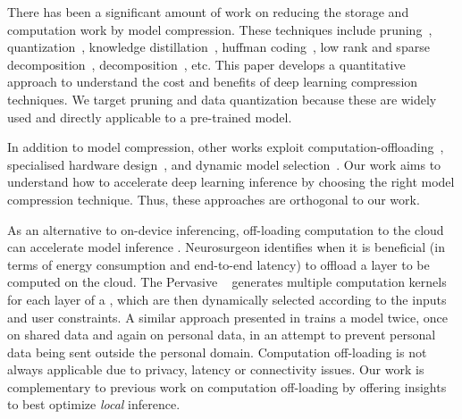 There has been a significant amount of work on reducing the storage and computation work by model compression. These techniques include
pruning~\cite{Li2016Pruning}, quantization~\cite{Gong2014Compressing,han2015deep}, knowledge
distillation~\cite{hinton2015distilling,Sau2016Deep}, huffman coding~\cite{han2015deep}, low rank and sparse decomposition~\cite{denton2014exploiting}, decomposition~\cite{lebedev2014speeding}, etc. This paper develops a quantitative approach to
understand the cost and benefits of deep learning compression techniques. We target pruning and data quantization because these are widely
used and directly applicable to a pre-trained model.



In addition to model compression, other works exploit computation-offloading~\cite{teerapittayanon2017distributed,Kang2017neurosurgeon},
specialised hardware design~\cite{chen2017eyeriss,Han:2016:EEI:3001136.3001163}, and dynamic model
selection~\cite{Taylor:2018:ADL:3211332.3211336}. Our work aims to understand how to accelerate deep learning inference by choosing the
right model compression technique. Thus, these approaches are orthogonal to our work.


As an alternative to on-device inferencing, off-loading computation to the cloud can accelerate \DNN model inference
\cite{teerapittayanon2017distributed}. Neurosurgeon \cite{Kang2017neurosurgeon} identifies when it is beneficial (\eg in terms of energy
consumption and end-to-end latency) to offload a \DNN layer to be computed on the cloud. The Pervasive \CNN~\cite{song2017towards}
generates multiple computation kernels for each layer of a \CNN, which are then dynamically selected according to the inputs and user
constraints. A similar approach presented in \cite{servia2017personal} trains a model twice, once on shared data and again on personal
data, in an attempt to prevent personal data being sent outside the personal domain. Computation off-loading is not always applicable due
to privacy, latency or connectivity issues. Our work is complementary to previous work on computation off-loading by offering insights to
best optimize \emph{local} inference.



